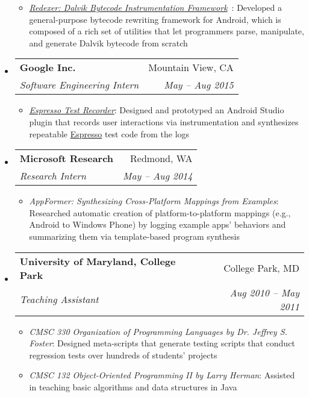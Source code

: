 \documentclass[letterpaper,11pt]{article}
\makeatletter
\newcommand{\ressubheading}[4]{
\begin{tabular*}{6.5in}{l@{\extracolsep{\fill}}r}
    \textbf{#1} & #2 \\
    \textit{#3} & \textit{#4} \\
\end{tabular*}\vspace{-6pt}}
\makeatother
\begin{document}
\begin{itemize}
{\begin{itemize}
\item\emph{\href{https://github.com/plum-umd/redexer}{Redexer: Dalvik Bytecode Instrumentation Framework}}~\cite{spsm12, drandroid, acplib}:
Developed a general-purpose bytecode rewriting framework for Android,
which is composed of a rich set of utilities that let programmers
parse, manipulate, and generate Dalvik bytecode from scratch
        \end{itemize}
        }
    \item
      \ressubheading{{Google Inc.}}{Mountain View, CA}{Software Engineering Intern}{May -- Aug 2015}
        {
\small
        \begin{itemize}
\item\emph{\href{https://developer.android.com/studio/test/espresso-test-recorder.html}{Espresso Test Recorder}}:
Designed and prototyped an Android Studio plugin that records user interactions
via instrumentation and synthesizes repeatable
\href{https://developer.android.com/training/testing/ui-testing/espresso-testing.html}{Espresso}
test code from the logs
        \end{itemize}
        }
    \item
      \ressubheading{{Microsoft Research}}{Redmond, WA}{Research Intern}{May -- Aug 2014}
        {
\small
        \begin{itemize}
\item\emph{AppFormer: Synthesizing Cross-Platform Mappings from Examples}:
Researched automatic creation of platform-to-platform mappings
(e.g., Android to Windows Phone) by logging example apps' behaviors and
summarizing them via template-based program synthesis
        \end{itemize}
        }
    \item
      \ressubheading{{University of Maryland, College Park}}{College Park, MD}{Teaching Assistant}{Aug 2010 -- May 2011}
        {
\small
        \begin{itemize}
\item\emph{CMSC 330 Organization of Programming Languages by Dr. Jeffrey S. Foster}:
Designed meta-scripts that generate testing scripts
that conduct regression tests over hundreds of students' projects
\item\emph{CMSC 132 Object-Oriented Programming II by Larry Herman}:
Assisted in teaching basic algorithms and data structures in Java
        \end{itemize}
        }


\end{itemize}
\end{document}
